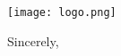 \documentclass[11pt,a4paper,roman]{moderncv}
\begin{document}
\begin{minipage}[t]{\textwidth}
\texttt{[image: logo.png]}
\end{minipage}


\opening{\vspace*{-2em}}
\closing{Sincerely,}{\vspace*{-2em}}  
\makelettertitle
\justifying


\lipsum[2-5] %


\makeletterclosing
\end{document}
